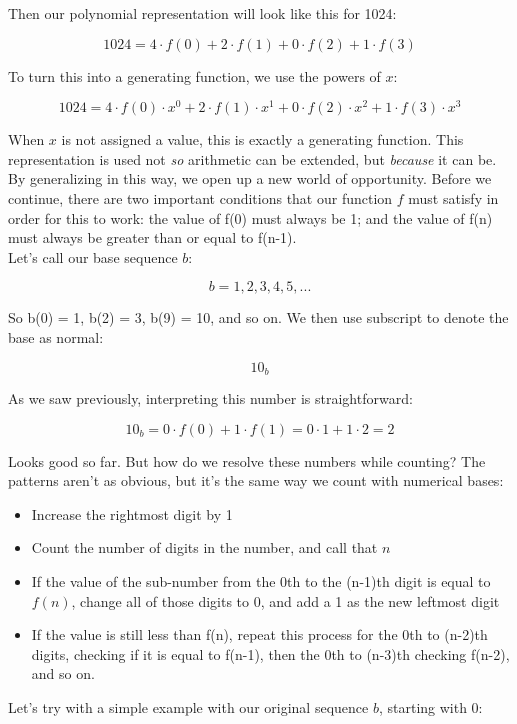 \documentclass{article}
\begin{document}
\noindent Then our polynomial representation will look like this for 1024:

$$1024 = 4 \cdot f(0) + 2 \cdot f(1) + 0 \cdot f(2) + 1 \cdot f(3)$$

\noindent To turn this into a generating function, we use the powers of $x$:

$$1024 = 4 \cdot f(0) \cdot x^0 + 2 \cdot f(1) \cdot x^1 + 0 \cdot f(2) \cdot x^2 + 1 \cdot f(3) \cdot x^3$$

\noindent When $x$ is not assigned a value, this is exactly a generating function. This representation is used not \textit{so} arithmetic can be extended, but \textit{because} it can be. By generalizing in this way, we open up a new world of opportunity. Before we continue, there are two important conditions that our function $f$ must satisfy in order for this to work: the value of f(0) must always be 1; and the value of f(n) must always be greater than or equal to f(n-1).\\

\noindent Let's call our base sequence $b$:

$$b = 1,2,3,4,5,...$$

\noindent So b(0) = 1, b(2) = 3, b(9) = 10, and so on. We then use subscript to denote the base as normal:

$$10_b$$

\noindent As we saw previously, interpreting this number is straightforward:

$$10_b = 0 \cdot f(0) + 1 \cdot f(1) = 0 \cdot 1 + 1 \cdot 2 = 2$$

\noindent Looks good so far. But how do we resolve these numbers while counting? The patterns aren't as obvious, but it's the same way we count with numerical bases:

\begin{itemize}
\item Increase the rightmost digit by 1
\item Count the number of digits in the number, and call that $n$
\item If the value of the sub-number from the 0th to the (n-1)th digit is equal to $f(n)$, change all of those digits to 0, and add a 1 as the new leftmost digit
\item If the value is still less than f(n), repeat this process for the 0th to (n-2)th digits, checking if it is equal to f(n-1), then the 0th to (n-3)th checking f(n-2), and so on. 
\end{itemize}

\noindent Let's try with a simple example with our original sequence $b$, starting with 0:
\end{document}
